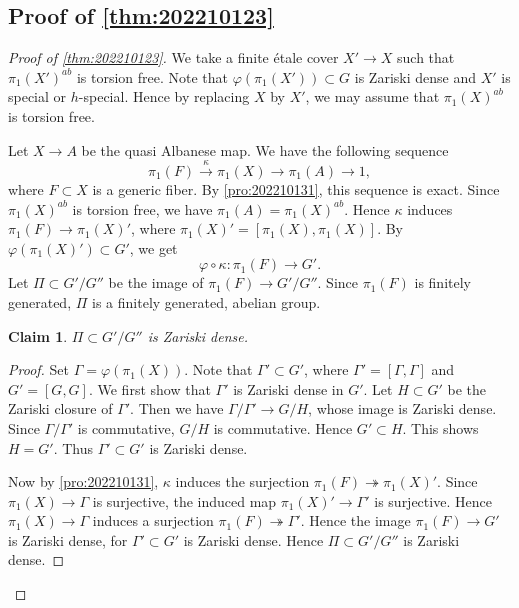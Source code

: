 \documentclass[11pt,english]{smfart}
\theoremstyle{plain}
\newtheorem{claim}[thm]{Claim}
\theoremstyle{definition}
\theoremstyle{remark}
\numberwithin{equation}{subsection}
\theoremstyle{plain}
\begin{document}
\subsection{Proof of \cref{thm:202210123}}\label{s4}
\begin{proof}[Proof of \cref{thm:202210123}]
We take a finite {\'e}tale cover $X'\to X$ such that $\pi_1(X')^{ab}$ is torsion free.
Note that $\varphi(\pi_1(X'))\subset G$ is Zariski dense and $X'$ is special or $h$-special.
Hence by replacing $X$ by $X'$, we may assume that $\pi_1(X)^{ab}$ is torsion free.


Let $X\to A$ be the quasi Albanese map.
We have the following sequence 
\begin{equation}\label{eqn:202210131}
\pi_1(F)\overset{\kappa}{\to} \pi_1(X)\to \pi_1(A)\to 1,
\end{equation}
where $F\subset X$ is a generic fiber.
By \cref{pro:202210131}, this sequence is exact.
Since $\pi_1(X)^{ab}$ is torsion free, we have $\pi_1(A)=\pi_1(X)^{ab}$.
Hence $\kappa$ induces $\pi_1(F)\to\pi_1(X)'$, where $\pi_1(X)'= [\pi_1(X),\pi_1(X)]$.
By $\varphi(\pi_1(X)')\subset G'$, we get 
$$\varphi\circ\kappa:\pi_1(F)\to G'.$$
Let $\Pi\subset G'/G''$ be the image of $\pi_1(F)\to G'/G''$.
Since $\pi_1(F)$ is finitely generated, $\Pi$ is a finitely generated, abelian group. 


\begin{claim}\label{claim:202210153}
$\Pi\subset G'/G''$ is Zariski dense.
\end{claim}


\begin{proof}
Set $\Gamma=\varphi(\pi_1(X))$.
Note that $\Gamma' \subset G'$, where $\Gamma'=[\Gamma,\Gamma]$ and $G'=[G,G]$.
We first show that $\Gamma'$ is Zariski dense in $G'$.
Let $H\subset G'$ be the Zariski closure of $\Gamma'$.
Then we have $\Gamma/\Gamma'\to G/H$, whose image is Zariski dense.
Since $\Gamma/\Gamma'$ is commutative, $G/H$ is commutative.
Hence $G'\subset H$.
This shows $H=G'$.
Thus $\Gamma'\subset G'$ is Zariski dense.

Now by \cref{pro:202210131}, $\kappa$ induces the surjection $\pi_1(F)\twoheadrightarrow \pi_1(X)'$.
Since $\pi_1(X)\to\Gamma$ is surjective, the induced map $\pi_1(X)'\to\Gamma'$ is surjective.
Hence $\pi_1(X)\to \Gamma$ induces a surjection $\pi_1(F)\twoheadrightarrow \Gamma'$.
Hence the image $\pi_1(F)\to G'$ is Zariski dense, for $\Gamma'\subset G'$ is Zariski dense.
Hence $\Pi\subset G'/G''$ is Zariski dense.
\end{proof}



\end{proof}
\end{document}
